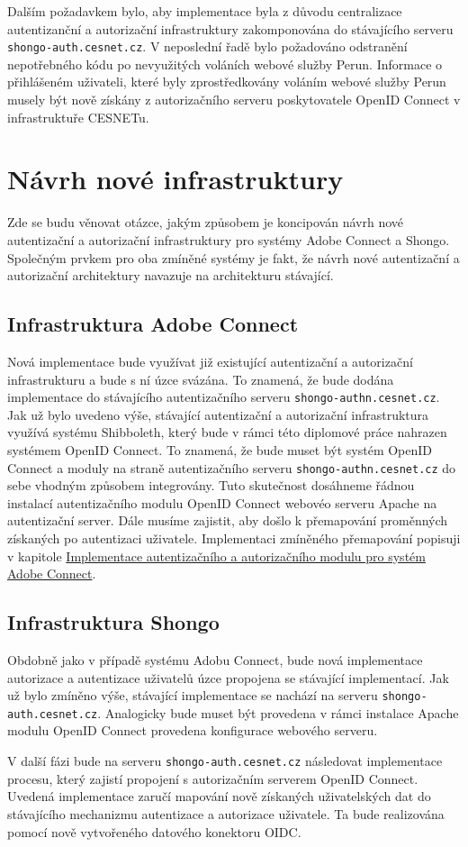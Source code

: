 \documentclass[
  printed, %
  twoside, %
  table,   %
  nolof,     %
  nolot,     %
]{fithesis3}
\begin{document}
Dalším požadavkem bylo, aby implementace byla z důvodu centralizace autentizanční a autorizační infrastruktury zakomponována do stávajícího serveru \texttt{shongo-auth.cesnet.cz}. V neposlední řadě bylo požadováno odstranění nepotřebného kódu po nevyužitých voláních webové služby Perun. Informace o přihlášeném uživateli, které byly zprostředkovány voláním webové služby Perun musely být nově získány z autorizačního serveru poskytovatele OpenID Connect v infrastruktuře CESNETu.     


\section{Návrh nové infrastruktury}
Zde se budu věnovat otázce, jakým způsobem je koncipován návrh nové autentizační a autorizační infrastruktury pro systémy Adobe Connect a Shongo. Společným prvkem pro oba zmíněné systémy je fakt, že návrh nové autentizační a autorizační architektury navazuje na architekturu stávající. 

\subsection{Infrastruktura Adobe Connect}
Nová implementace bude využívat již existující autentizační a autorizační infrastrukturu a bude s ní úzce svázána. To znamená, že bude dodána implementace do stávajícího autentizačního serveru \texttt{shongo-authn.cesnet.cz}. Jak už bylo uvedeno výše, stávající autentizační a autorizační infrastruktura využívá systému Shibboleth, který bude v rámci této diplomové práce nahrazen systémem OpenID Connect. To znamená, že bude muset být systém OpenID Connect a moduly na straně autentizačního serveru \texttt{shongo-authn.cesnet.cz} do sebe vhodným způsobem integrovány. Tuto skutečnost dosáhneme řádnou instalací  autentizačního modulu OpenID Connect webovéo serveru Apache na autentizační server. Dále musíme zajistit, aby došlo k přemapování proměnných získaných po autentizaci uživatele. Implementaci zmíněného přemapování popisuji v kapitole \hyperref[ACImpl]{Implementace autentizačního a autorizačního modulu pro systém Adobe Connect}. 

\subsection{Infrastruktura Shongo}
Obdobně jako v případě systému Adobu Connect, bude nová implementace autorizace a autentizace uživatelů úzce propojena se stávající implementací. Jak už bylo zmíněno výše, stávající implementace se nachází na serveru \texttt{shongo-auth.cesnet.cz}. Analogicky bude muset být provedena v rámci instalace Apache modulu OpenID Connect provedena konfigurace webového serveru. \par
V další fázi bude na serveru \texttt{shongo-auth.cesnet.cz} následovat implementace procesu, který zajistí propojení s autorizačním serverem OpenID Connect. Uvedená implementace zaručí mapování nově získaných uživatelských dat do stávajícího mechanizmu autentizace a autorizace uživatele. Ta bude realizována pomocí nově vytvořeného datového konektoru OIDC.
\par
\end{document}
